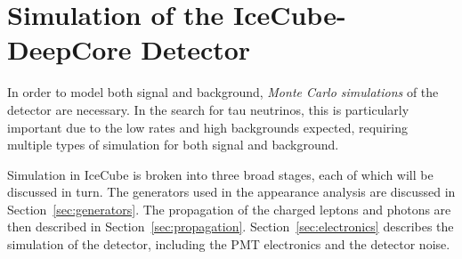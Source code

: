 \chapter{Simulation of the IceCube-DeepCore Detector}
In order to model both signal and background, \emph{Monte Carlo simulations} of the detector are necessary. 
In the search for tau neutrinos, this is particularly important due to the low rates and high backgrounds expected, requiring multiple types of simulation for both signal and background.

Simulation in IceCube is broken into three broad stages, each of which will be discussed in turn.
The generators used in the appearance analysis are discussed in Section~\ref{sec:generators}.
The propagation of the charged leptons and photons are then described in Section~\ref{sec:propagation}.
Section~\ref{sec:electronics} describes the simulation of the detector, including the PMT electronics and the detector noise.

\label{sec:generators}


\label{sec:propagation}


\label{sec:electronics}

